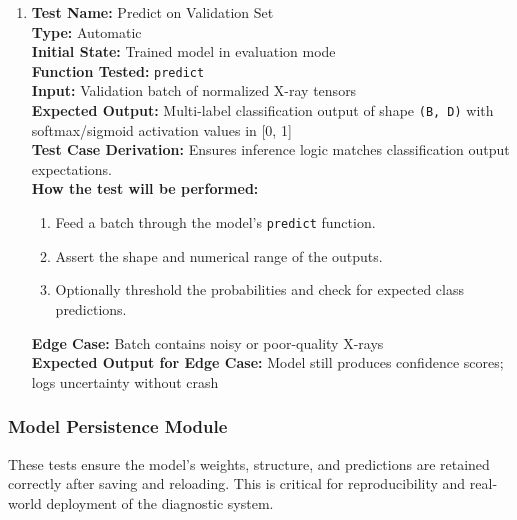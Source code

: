 \documentclass[12pt, titlepage]{article}
\begin{document}
\begin{enumerate}
  \item \textbf{Test Name:} Predict on Validation Set\\
  \textbf{Type:} Automatic\\
  \textbf{Initial State:} Trained model in evaluation mode\\
  \textbf{Function Tested:} \verb|predict|\\
  \textbf{Input:} Validation batch of normalized X-ray tensors\\
  \textbf{Expected Output:} Multi-label classification output of shape \verb|(B, D)| with softmax/sigmoid activation values in [0, 1]\\
  \textbf{Test Case Derivation:} Ensures inference logic matches classification output expectations.\\
  \textbf{How the test will be performed:}
  \begin{enumerate}
    \item Feed a batch through the model's \verb|predict| function.
    \item Assert the shape and numerical range of the outputs.
    \item Optionally threshold the probabilities and check for expected class predictions.
  \end{enumerate}
  \textbf{Edge Case:} Batch contains noisy or poor-quality X-rays\\
  \textbf{Expected Output for Edge Case:} Model still produces confidence scores; logs uncertainty without crash\\
\end{enumerate}

\subsubsection{Model Persistence Module}
These tests ensure the model's weights, structure, and predictions are retained correctly after saving and reloading. This is critical for reproducibility and real-world deployment of the diagnostic system.
\end{document}
